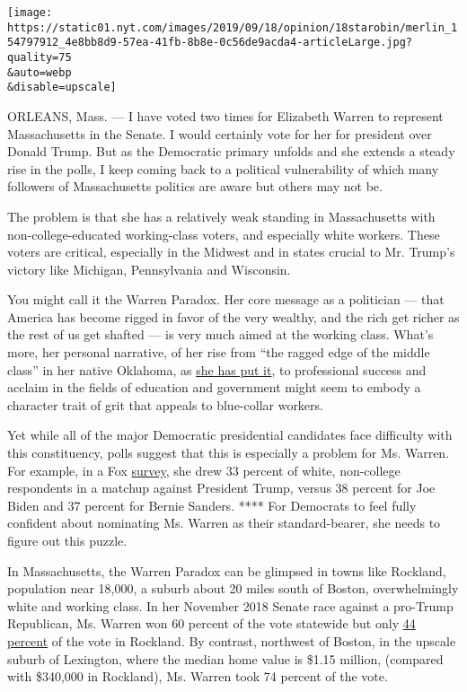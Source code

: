 \texttt{[image: https://static01.nyt.com/images/2019/09/18/opinion/18starobin/merlin\_154797912\_4e8bb8d9-57ea-41fb-8b8e-0c56de9acda4-articleLarge.jpg?quality=75\\\&auto=webp\\\&disable=upscale]}

ORLEANS, Mass. --- I have voted two times for Elizabeth Warren to
represent Massachusetts in the Senate. I would certainly vote for her
for president over Donald Trump. But as the Democratic primary unfolds
and she extends a steady rise in the polls, I keep coming back to a
political vulnerability of which many followers of Massachusetts
politics are aware but others may not be.

The problem is that she has a relatively weak standing in Massachusetts
with non-college-educated working-class voters, and especially white
workers. These voters are critical, especially in the Midwest and in
states crucial to Mr. Trump's victory like Michigan, Pennsylvania and
Wisconsin.

You might call it the Warren Paradox. Her core message as a politician
--- that America has become rigged in favor of the very wealthy, and the
rich get richer as the rest of us get shafted --- is very much aimed at
the working class. What's more, her personal narrative, of her rise from
``the ragged edge of the middle class'' in her native Oklahoma, as
\href{https://twitter.com/ewarren/status/1133840956158042115?lang=en}{she
has put it}, to professional success and acclaim in the fields of
education and government might seem to embody a character trait of grit
that appeals to blue-collar workers.

Yet while all of the major Democratic presidential candidates face
difficulty with this constituency, polls suggest that this is especially
a problem for Ms. Warren. For example, in a Fox
\href{https://www.foxnews.com/politics/fox-news-poll-8-15}{survey}, she
drew 33 percent of white, non-college respondents in a matchup against
President Trump, versus 38 percent for Joe Biden and 37 percent for
Bernie Sanders. **** For Democrats to feel fully confident about
nominating Ms. Warren as their standard-bearer, she needs to figure out
this puzzle.

In Massachusetts, the Warren Paradox can be glimpsed in towns like
Rockland, population near 18,000, a suburb about 20 miles south of
Boston, overwhelmingly white and working class. In her November 2018
Senate race against a pro-Trump Republican, Ms. Warren won 60 percent of
the vote statewide but only
\href{https://www.wbur.org/news/2018/11/06/warren-beats-geoff-diehl}{44
percent} of the vote in Rockland. By contrast, northwest of Boston, in
the upscale suburb of Lexington, where the median home value is \$1.15
million, (compared with \$340,000 in Rockland), Ms. Warren took 74
percent of the vote.

